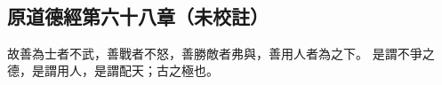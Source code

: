 ﻿%
%

\chapter{~}

\section{原道德經第六十八章（未校註）}

\begin{withgezhu}

\zhsong


故善為士者不武，善戰者不怒，善勝敵者弗與，善用人者為之下。
是謂不爭之德，是謂用人，是謂配天；古之極也。

\end{withgezhu}
